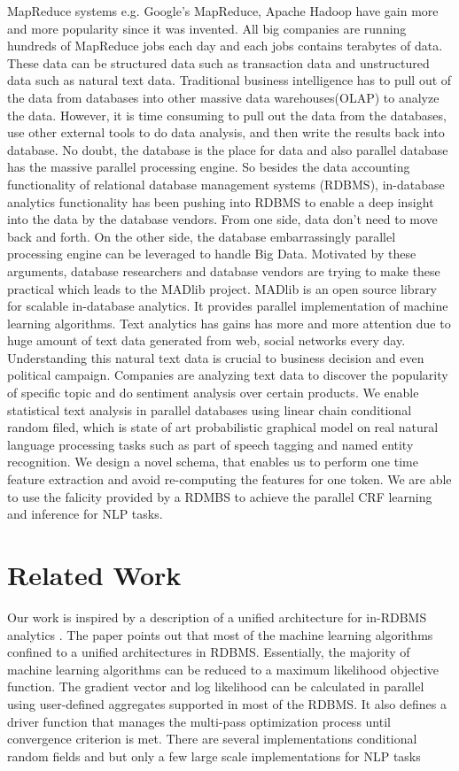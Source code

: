 \documentclass[11pt,letterpaper]{article}
\begin{document}
MapReduce systems e.g. Google's MapReduce, Apache Hadoop have gain more and more popularity since it was invented. All big companies are running hundreds of MapReduce jobs each day and each jobs contains terabytes of data.  These data can be structured data such as transaction data and unstructured data such as natural text data. 
Traditional business intelligence has to pull out of the data from databases into other massive data warehouses(OLAP) to analyze the data. 
However, it is time consuming to pull out the data from the databases, use other external tools to do data analysis, and then write the results back into database.
No doubt, the database is the place for data and also parallel database has the massive parallel processing engine. 
So besides the data accounting functionality of relational database management systems (RDBMS), in-database analytics functionality has been pushing into RDBMS to enable a deep insight into the data by the database vendors.  From one side, data don’t need to move back and forth.
On the other side, the database embarrassingly parallel processing engine can be leveraged to handle Big Data. 
Motivated by these arguments, database researchers and database vendors are trying to make these practical which leads to the MADlib project. MADlib is an open source library for scalable in-database analytics. It provides parallel implementation of machine learning algorithms.
Text analytics has gains has more and more attention due to huge amount of text data generated from web, social networks every day.
Understanding this natural text data is crucial to business decision and even political campaign. 
Companies are analyzing text data to discover the popularity of specific topic and do sentiment analysis over certain products.
We enable statistical text analysis in parallel databases using linear chain conditional random filed, which is state of art 
probabilistic graphical model on real natural language processing tasks such as part of speech tagging and named entity recognition.
We design a novel schema, that enables us to 
perform one time feature extraction and avoid re-computing the features for one token. 
We are able to use the falicity provided by a RDMBS to achieve the parallel CRF learning and inference for NLP tasks.

\section{Related Work}
Our work is inspired by a description of a unified architecture for in-RDBMS analytics \cite{Feng:2012:TUA:2213836.2213874}.
The paper points out that most of the machine learning algorithms confined to a unified architectures in RDBMS\@.
Essentially, the majority of machine learning algorithms can be reduced to a maximum likelihood objective function. %
The gradient vector and log likelihood can be calculated in parallel using user-defined aggregates supported in most of the RDBMS.
It also defines a driver function that manages the multi-pass optimization process until convergence criterion is met.
There are several implementations conditional random fields and but only a few large scale implementations for NLP tasks 
\end{document}
